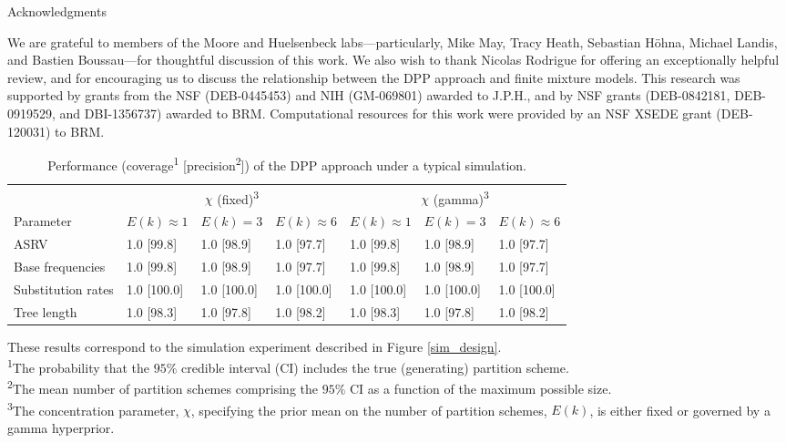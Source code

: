 \documentclass[11pt]{article}
\begin{document}
\begin{center}
{\sc Acknowledgments}
\end{center}

\noindent
We are grateful to members of the Moore and Huelsenbeck labs---particularly, Mike May, Tracy Heath, Sebastian H\"ohna, Michael Landis, and Bastien Boussau---for thoughtful discussion of this work.
We also wish to thank Nicolas Rodrigue for offering an exceptionally helpful review, and for encouraging us to discuss the relationship between the DPP approach and finite mixture models.
This research was supported by grants from the NSF (DEB-0445453) and NIH (GM-069801) awarded to J.P.H., and by NSF grants (DEB-0842181, DEB-0919529, and DBI-1356737) awarded to BRM.
Computational resources for this work were provided by an NSF XSEDE grant (DEB-120031) to BRM.

\newpage

%

\newpage
\begin{table}[h!]
\caption{Performance (coverage\textsuperscript{1} [precision\textsuperscript{2}]) of the DPP approach under a typical simulation.}
\centering
\begin{tabular}{lllllll}
\toprule
& \multicolumn{3}{c}{$\chi$ (fixed)\textsuperscript{3}}  & \multicolumn{3}{c}{$\chi$ (gamma)\textsuperscript{3}} \\
\cmidrule(r){2-4} \cmidrule(r){5-7}
Parameter & $E(k) \approx 1$ & $E(k) =3$ & $E(k) \approx 6$ & $E(k) \approx 1$ & $E(k) =3$ & $E(k) \approx 6$ \\ 
\midrule
ASRV & 1.0 [99.8] & 1.0 [98.9] & 1.0 [97.7] & 1.0 [99.8] & 1.0 [98.9] & 1.0 [97.7] \\ 
\rowcolor{gray!20}
Base frequencies & 1.0 [99.8] & 1.0 [98.9] & 1.0 [97.7] & 1.0 [99.8] & 1.0 [98.9] & 1.0 [97.7] \\ 
Substitution rates & 1.0 [100.0] & 1.0 [100.0] & 1.0 [100.0] & 1.0 [100.0] & 1.0 [100.0] & 1.0 [100.0]  \\ 
\rowcolor{gray!20}
Tree length & 1.0 [98.3] & 1.0 [97.8] & 1.0 [98.2] & 1.0 [98.3] & 1.0 [97.8] & 1.0 [98.2]  \\ 
\end{tabular}

\medskip
{\fontsize{9}{9}\selectfont
\begin{adjustwidth}{.2cm}{.1cm}
These results correspond to the simulation experiment described in Figure \ref{sim_design}.\\
\textsuperscript{1}The probability that the $95\%$ credible interval (CI) includes the true (generating) partition scheme.\\
\textsuperscript{2}The mean number of partition schemes comprising the $95\%$ CI as a function of the maximum possible size.\\
\textsuperscript{3}The concentration parameter, $\chi$, specifying the prior mean on the number of partition schemes, $E(k)$, is either fixed or governed by a gamma hyperprior.
\end{adjustwidth}}
\label{tab:simulation}
\end{table}
\end{document}
